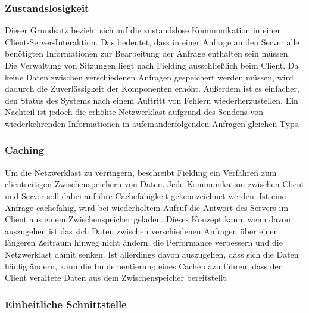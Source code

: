 \subsubsection{Zustandslosigkeit}
\label{sec:ROA:Zustandslosigkeit}

Dieser Grundsatz bezieht sich auf die zustandslose Kommunikation in einer Client-Server-Interaktion. Das bedeutet, dass in einer Anfrage an den Server alle benötigten Informationen zur Bearbeitung der Anfrage enthalten sein müssen. Die Verwaltung von Sitzungen liegt nach Fielding ausschließlich beim Client. Da keine Daten zwischen verschiedenen Anfragen gespeichert werden müssen, wird dadurch die Zuverlässigkeit der Komponenten erhöht. Außerdem ist es einfacher, den Status des Systems nach einem Auftritt von Fehlern wiederherzustellen. Ein Nachteil ist jedoch die erhöhte Netzwerklast aufgrund des Sendens von wiederkehrenden Informationen in aufeinanderfolgenden Anfragen gleichen Typs.

\subsubsection{Caching}

Um die Netzwerklast zu verringern, beschreibt Fielding ein Verfahren zum clientseitigen Zwischenspeichern von Daten. Jede Kommunikation zwischen Client und Server soll dabei auf ihre Cachefähigkeit gekennzeichnet werden. Ist eine Anfrage cachefähig, wird bei wiederholtem Aufruf die Antwort des Servers im Client aus einem Zwischenspeicher geladen. \parencite[vgl.][79\psqq]{Fielding2000} Dieses Konzept kann, wenn davon auszugehen ist das sich Daten zwischen verschiedenen Anfragen über einen längeren Zeitraum hinweg nicht ändern, die Performance verbessern und die Netzwerklast damit senken. Ist allerdings davon auszugehen, dass sich die Daten häufig ändern, kann die Implementierung eines Cache dazu führen, dass der Client veraltete Daten aus dem Zwischenspeicher bereitstellt.

\subsubsection{Einheitliche Schnittstelle}
\label{sec:ROA:Einheitliche Schnittstelle}

